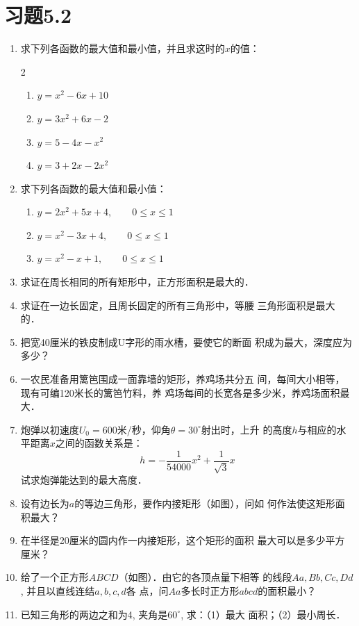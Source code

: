 \section*{习题5.2}
\begin{enumerate}
    \item 求下列各函数的最大值和最小值，并且求这时的$x$的值：
\begin{multicols}{2}
\begin{enumerate}
    \item $y=x^2-6x+10$
    \item $y=3x^2+6x-2$
    \item $y=5-4x-x^2$
    \item $y=3+2x-2x^2$
\end{enumerate}
\end{multicols}
    \item 求下列各函数的最大值和最小值：
\begin{enumerate}
    \item $y=2x^2+5x+4,\qquad    0\le x\le 1$
    \item $y=x^2-3x+4,\qquad      0\le x\le 1$
    \item $y=x^2-x+1,\qquad      0\le x\le 1$
\end{enumerate}
\item 求证在周长相同的所有矩形中，正方形面积是最大的．
\item 求证在一边长固定，且周长固定的所有三角形中，等腰
三角形面积是最大的．
\item 把宽40厘米的铁皮制成U字形的雨水槽，要使它的断面
积成为最大，深度应为多少？
\item 一农民准备用篱笆围成一面靠墙的矩形，养鸡场共分五
间，每间大小相等，现有可编120米长的篱笆竹料，养
鸡场每间的长宽各是多少米，养鸡场面积最大．
\item 炮弹以初速度$U_0=600$米/秒，仰角$\theta=30^{\circ}$射出时，上升
的高度$h$与相应的水平距离$x$之间的函数关系是：
\[h=-\frac{1}{54000}x^2+\frac{1}{\sqrt{3}}x\]
试求炮弹能达到的最大高度．
\item 设有边长为$a$的等边三角形，要作内接矩形（如图），问如
何作法使这矩形面积最大？
\item 在半径是20厘米的圆内作一内接矩形，这个矩形的面积
最大可以是多少平方厘米？
\item 给了一个正方形$ABCD$（如图）．由它的各顶点量下相等
的线段$Aa,Bb,Cc,Dd$, 并且以直线连结$a,b,c,d$各
点，问$Aa$多长时正方形$abcd$的面积最小？
\item 已知三角形的两边之和为4, 夹角是$60^{\circ}$, 求：（1）最大
面积；（2）最小周长．


\end{enumerate}
